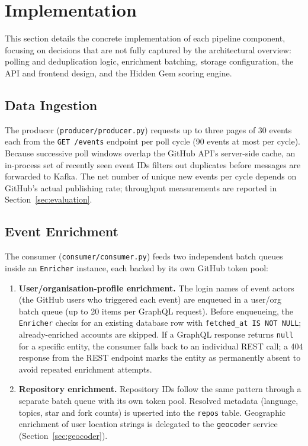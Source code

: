 \documentclass[sigconf]{acmart}
\begin{document}
\section{Implementation}
\label{sec:implementation}

This section details the concrete implementation of each pipeline component,
focusing on decisions that are not fully captured by the architectural overview:
polling and deduplication logic, enrichment batching, storage configuration,
the API and frontend design, and the Hidden Gem scoring engine.

\subsection{Data Ingestion}

The producer (\texttt{producer/producer.py}) requests up to three pages of
30 events each from the \texttt{GET /events} endpoint per poll cycle (90 events
at most per cycle). Because successive poll windows overlap the GitHub API's
server-side cache, an in-process set of recently seen event IDs filters out
duplicates before messages are forwarded to Kafka. The net number of unique new
events per cycle depends on GitHub's actual publishing rate; throughput
measurements are reported in Section~\ref{sec:evaluation}.

\subsection{Event Enrichment}

The consumer (\texttt{consumer/consumer.py}) feeds two independent batch queues
inside an \texttt{Enricher} instance, each backed by its own GitHub token pool:

\begin{enumerate}
  \item \textbf{User/organisation-profile enrichment.} The login names of event
    actors (the GitHub users who triggered each event) are enqueued in a user/org
    batch queue (up to 20 items per GraphQL request). Before enqueueing, the
    \texttt{Enricher} checks for an existing database row with
    \texttt{fetched\_at IS NOT NULL}; already-enriched accounts are skipped. If a
    GraphQL response returns \texttt{null} for a specific entity, the consumer
    falls back to an individual REST call; a 404 response from the REST endpoint
    marks the entity as permanently absent to avoid repeated enrichment attempts.
  \item \textbf{Repository enrichment.} Repository IDs follow the same pattern
    through a separate batch queue with its own token pool. Resolved metadata
    (language, topics, star and fork counts) is upserted into the \texttt{repos}
    table. Geographic enrichment of user location strings is delegated to the
    \texttt{geocoder} service (Section~\ref{sec:geocoder}).
\end{enumerate}
\end{document}
